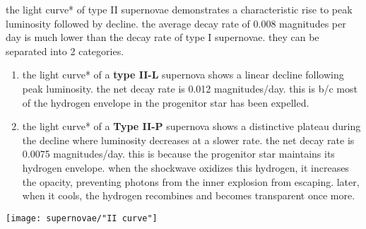 the \gls{light curve}* of type II supernovae demonstrates a characteristic rise to peak luminosity followed by decline. the average decay rate of 0.008 magnitudes per day is much lower than the decay rate of type I supernovae. they can be separated into 2 categories. 
\begin{enumerate}
	\item the \gls{light curve}* of a \textbf{type II-L} supernova shows a linear decline following peak luminosity. the net decay rate is 0.012 magnitudes/day. this is b/c most of the hydrogen envelope in the progenitor star has been expelled.
	\item the \gls{light curve}* of a \textbf{Type II-P} supernova shows a distinctive plateau during the decline where luminosity decreases at a slower rate. the net decay rate is 0.0075 magnitudes/day. this is because the progenitor star maintains its hydrogen envelope. when the shockwave oxidizes this hydrogen, it increases the opacity, preventing photons from the inner explosion from escaping. later, when it cools, the hydrogen recombines and becomes transparent once more.
\end{enumerate}
\begin{center}
\texttt{[image: supernovae/"II curve"]}
\end{center}